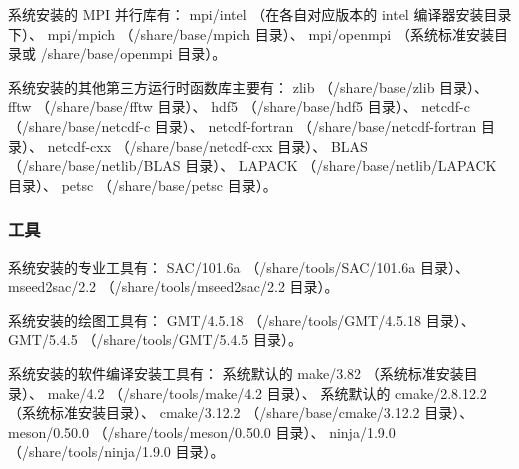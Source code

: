 \documentclass[UTF8]{ctexart}
\begin{document}
系统安装的 MPI 并行库有：\newline
mpi/intel （在各自对应版本的 intel 编译器安装目录下）、\newline
mpi/mpich （/share/base/mpich 目录）、\newline
mpi/openmpi （系统标准安装目录或 /share/base/openmpi 目录）。
\bigskip

系统安装的其他第三方运行时函数库主要有：\newline
zlib （/share/base/zlib 目录）、\newline
fftw （/share/base/fftw 目录）、\newline
hdf5 （/share/base/hdf5 目录）、\newline
netcdf-c （/share/base/netcdf-c 目录）、\newline
netcdf-fortran （/share/base/netcdf-fortran 目录）、\newline
netcdf-cxx （/share/base/netcdf-cxx 目录）、\newline
BLAS （/share/base/netlib/BLAS 目录）、\newline
LAPACK （/share/base/netlib/LAPACK 目录）、\newline
petsc （/share/base/petsc 目录）。

\subsubsection{工具}
系统安装的专业工具有：\newline
SAC/101.6a （/share/tools/SAC/101.6a 目录）、\newline
mseed2sac/2.2 （/share/tools/mseed2sac/2.2 目录）。
\bigskip

系统安装的绘图工具有：\newline
GMT/4.5.18 （/share/tools/GMT/4.5.18 目录）、\newline
GMT/5.4.5 （/share/tools/GMT/5.4.5 目录）。
\bigskip

系统安装的软件编译安装工具有：\newline
系统默认的 make/3.82 （系统标准安装目录）、\newline
make/4.2 （/share/tools/make/4.2 目录）、\newline
系统默认的 cmake/2.8.12.2 （系统标准安装目录）、\newline
cmake/3.12.2 （/share/base/cmake/3.12.2 目录）、\newline
meson/0.50.0 （/share/tools/meson/0.50.0 目录）、\newline
ninja/1.9.0 （/share/tools/ninja/1.9.0 目录）。
\bigskip
\end{document}
